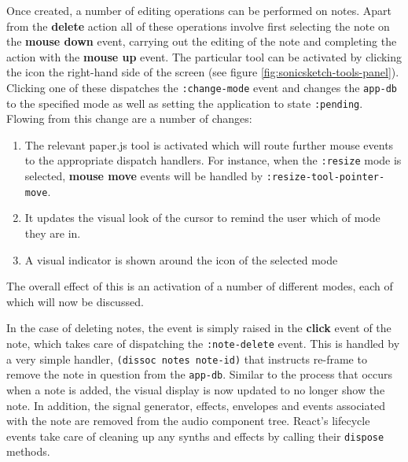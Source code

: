 \documentclass[12pt]{report}
\begin{document}
Once created, a number of editing operations can be performed on notes. Apart
from the \textbf{delete} action all of these operations involve first selecting the
note on the \textbf{mouse down} event, carrying out the editing of the note and
completing the action with the \textbf{mouse up} event. The particular tool can be
activated by clicking the icon the right-hand side of the screen (see figure
\ref{fig:sonicsketch-tools-panel}). Clicking one of these dispatches the
\texttt{:change-mode} event and changes the \texttt{app-db} to the specified mode as well as
setting the application to state \texttt{:pending}. Flowing from this change are a
number of changes:
\begin{enumerate}
\item The relevant paper.js tool is activated which will route further mouse
events to the appropriate dispatch handlers. For instance, when the
\texttt{:resize} mode is selected, \textbf{mouse move} events will be handled by
\texttt{:resize-tool-pointer-move}.
\item It updates the visual look of the cursor to remind the user which of mode
they are in.
\item A visual indicator is shown around the icon of the selected mode
\end{enumerate}
The overall effect of this is an activation of a number of different modes, each
of which will now be discussed.

In the case of deleting notes, the event is simply raised in the \textbf{click} event
of the note, which takes care of dispatching the \texttt{:note-delete} event. This is
handled by a very simple handler, \texttt{(dissoc notes note-id)} that instructs
re-frame to remove the note in question from the \texttt{app-db}. Similar to the
process that occurs when a note is added, the visual display is now updated to
no longer show the note. In addition, the signal generator, effects, envelopes
and events associated with the note are removed from the audio component tree.
React's lifecycle events take care of cleaning up any synths and
effects by calling their \texttt{dispose} methods.
\end{document}
